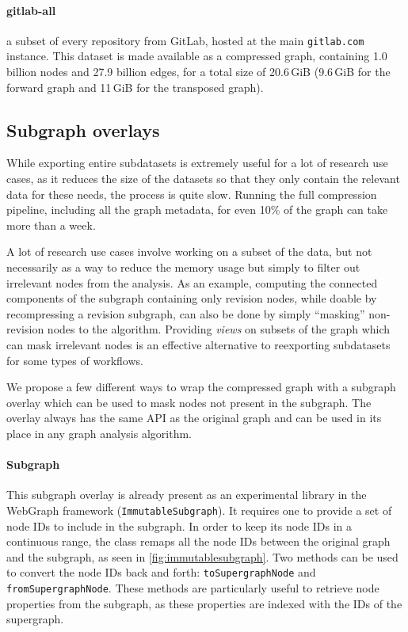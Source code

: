 \paragraph{gitlab-all} a subset of every repository from GitLab, hosted at the
main \texttt{gitlab.com} instance. This dataset is made available as a
compressed graph, containing 1.0 billion nodes and 27.9 billion edges, for a
total size of 20.6\,GiB (9.6\,GiB for the forward graph and 11\,GiB for the
transposed graph).

\subsection{Subgraph overlays}

While exporting entire subdatasets is extremely useful for a lot of research
use cases, as it reduces the size of the datasets so that they only contain the
relevant data for these needs, the process is quite slow. Running the full
compression pipeline, including all the graph metadata, for even 10\% of the
graph can take more than a week.

A lot of research use cases involve working on a subset of the data, but not
necessarily as a way to reduce the memory usage but simply to filter out
irrelevant nodes from the analysis. As an example, computing the connected
components of the subgraph containing only revision nodes, while doable by
recompressing a revision subgraph, can also be done by simply ``masking''
non-revision nodes to the algorithm. Providing \emph{views} on subsets of the
graph which can mask irrelevant nodes is an effective alternative to
reexporting subdatasets for some types of workflows.

We propose a few different ways to wrap the compressed graph with a subgraph
overlay which can be used to mask nodes not present in the subgraph. The
overlay always has the same API as the original graph and can be used in its
place in any graph analysis algorithm.

\paragraph{Subgraph}
This subgraph overlay is already present as an experimental library in the
WebGraph framework (\texttt{ImmutableSubgraph}). It requires one to provide a
set of node IDs to include in the subgraph. In order to keep its node IDs in a
continuous range, the class remaps all the node IDs between the original graph
and the subgraph, as seen in \cref{fig:immutablesubgraph}. Two methods can be
used to convert the node IDs back and forth: \texttt{toSupergraphNode} and
\texttt{fromSupergraphNode}. These methods are particularly useful to retrieve
node properties from the subgraph, as these properties are indexed with the IDs
of the supergraph.


